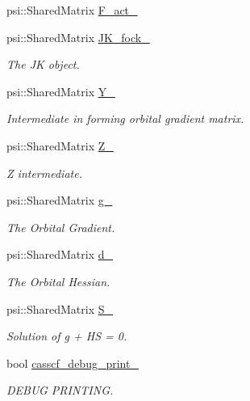 \begin{DoxyCompactItemize}
psi\+::\+Shared\+Matrix \mbox{\hyperlink{classforte_1_1_orbital_optimizer_a22131c8803cbc3732911cc6bd8393913}{F\+\_\+act\+\_\+}}
\item 
psi\+::\+Shared\+Matrix \mbox{\hyperlink{classforte_1_1_orbital_optimizer_a825df85d45912f07d32131818ac783de}{J\+K\+\_\+fock\+\_\+}}
\begin{DoxyCompactList}\small\item\em The JK object. \end{DoxyCompactList}\item 
psi\+::\+Shared\+Matrix \mbox{\hyperlink{classforte_1_1_orbital_optimizer_a3616eec66dda962613054ce8c792505d}{Y\+\_\+}}
\begin{DoxyCompactList}\small\item\em Intermediate in forming orbital gradient matrix. \end{DoxyCompactList}\item 
psi\+::\+Shared\+Matrix \mbox{\hyperlink{classforte_1_1_orbital_optimizer_aabb269507aaeefe6b56f918aa26c1768}{Z\+\_\+}}
\begin{DoxyCompactList}\small\item\em Z intermediate. \end{DoxyCompactList}\item 
psi\+::\+Shared\+Matrix \mbox{\hyperlink{classforte_1_1_orbital_optimizer_aeb4e4c1519a3f81859eb56c0d8cf74c5}{g\+\_\+}}
\begin{DoxyCompactList}\small\item\em The Orbital Gradient. \end{DoxyCompactList}\item 
psi\+::\+Shared\+Matrix \mbox{\hyperlink{classforte_1_1_orbital_optimizer_ada852e8c0a077b6f9b5ad56457d2913c}{d\+\_\+}}
\begin{DoxyCompactList}\small\item\em The Orbital Hessian. \end{DoxyCompactList}\item 
psi\+::\+Shared\+Matrix \mbox{\hyperlink{classforte_1_1_orbital_optimizer_a897d9d467633875f999de629bf61e433}{S\+\_\+}}
\begin{DoxyCompactList}\small\item\em Solution of g + HS = 0. \end{DoxyCompactList}\item 
bool \mbox{\hyperlink{classforte_1_1_orbital_optimizer_a3631de4de1b872fdbcd93554ec892ba6}{casscf\+\_\+debug\+\_\+print\+\_\+}}
\begin{DoxyCompactList}\small\item\em D\+E\+B\+UG P\+R\+I\+N\+T\+I\+NG. \end{DoxyCompactList}\item 

\end{DoxyCompactItemize}
